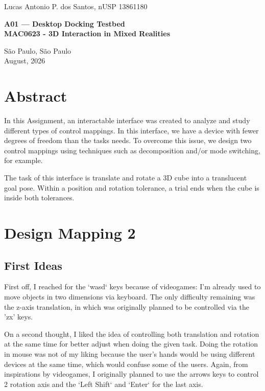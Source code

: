 \documentclass{article}
\begin{document}
\begin{titlepage}
\thispagestyle{empty}
\centering

{\large Lucas Antonio P. dos Santos, nUSP 13861180\par}

\vspace{7cm} %

{\textbf{\LARGE A01 — Desktop Docking Testbed}\\
\textbf{\Large MAC0623 - 3D Interaction in Mixed Realities}\par}

\vfill %

{\large São Paulo, São Paulo\\
August, 2026\par}
\end{titlepage}

\section{Abstract}

In this Assignment, an interactable interface was created to analyze and study different types of control mappings. In this interface, we have a device with fewer degrees of freedom than the tasks needs. To overcome this issue, we design two control mappings using techniques such as decomposition and/or mode switching, for example.

The task of this interface is translate and rotate a 3D cube into a translucent goal pose. Within a position and rotation tolerance, a trial ends when the cube is inside both tolerances.

\section{Design Mapping 2}

\subsection{First Ideas}

First off, I reached for the `wasd` keys because of videogames: I'm already used to move objects in two dimensions via keyboard. The only difficulty remaining was the z-axis translation, in which was originally planned to be controlled via the 'zx' keys.

On a second thought, I liked the idea of controlling both translation and rotation at the same time for better adjust when doing the given task. Doing the rotation in mouse was not of my liking because the user's hands would be using different devices at the same time, which would confuse some of the users. Again, from inspirations by videogames, I originally planned to use the arrows keys to control 2 rotation axis and the `Left Shift` and `Enter` for the last axis.
\end{document}
